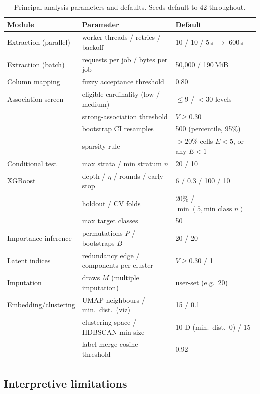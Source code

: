 \documentclass[11pt,a4paper]{article}
\begin{document}
\begin{table}[htbp]
\centering\small
\caption{Principal analysis parameters and defaults. Seeds default to 42 throughout.}
\label{tab:params}
\begin{tabular}{@{}lll@{}}
\toprule
\textbf{Module} & \textbf{Parameter} & \textbf{Default} \\
\midrule
Extraction (parallel) & worker threads / retries / backoff & 10 / 10 / 5\,s $\to$ 600\,s \\
Extraction (batch)    & requests per job / bytes per job & 50{,}000 / 190\,MiB \\
Column mapping        & fuzzy acceptance threshold & 0.80 \\
Association screen    & eligible cardinality (low / medium) & $\le 9$ / $< 30$ levels \\
                      & strong-association threshold & $V \ge 0.30$ \\
                      & bootstrap CI resamples & 500 (percentile, 95\%) \\
                      & sparsity rule & $>20\%$ cells $E<5$, or any $E<1$ \\
Conditional test      & max strata / min stratum $n$ & 20 / 10 \\
XGBoost               & depth / $\eta$ / rounds / early stop & 6 / 0.3 / 100 / 10 \\
                      & holdout / CV folds & 20\% / $\min(5, \text{min class } n)$ \\
                      & max target classes & 50 \\
Importance inference  & permutations $P$ / bootstraps $B$ & 20 / 20 \\
Latent indices        & redundancy edge / components per cluster & $V \ge 0.30$ / 1 \\
Imputation            & draws $M$ (multiple imputation) & user-set (e.g.\ 20) \\
Embedding/clustering  & UMAP neighbours / min.\ dist.\ (viz) & 15 / 0.1 \\
                      & clustering space / HDBSCAN min size & 10-D (min.\ dist.\ 0) / 15 \\
                      & label merge cosine threshold & 0.92 \\
\bottomrule
\end{tabular}
\end{table}

\subsection{Interpretive limitations}
\end{document}
